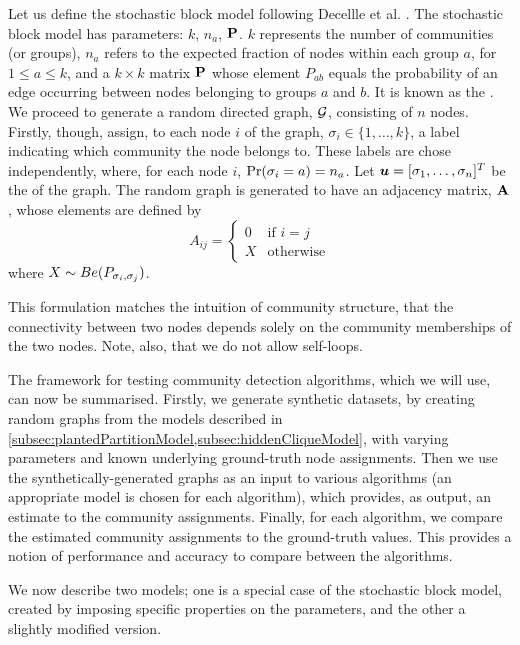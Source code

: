 Let us define the stochastic block model following Decellle et al. \cite{DKM+13}. The stochastic block model has parameters: $k$, $n_{a}$, $\mathbf P$. $k$ represents the number of communities (or groups), $n_{a}$ refers to the expected fraction of nodes within each group $a$, for $1 \leq a \leq k$, and a $k \times k$ matrix $\mathbf P$ whose element $P_{ab}$ equals the probability of an edge occurring between nodes belonging to groups $a$ and $b$. It is known as the .
We proceed to generate a random directed graph, $\mathcal G$, consisting of $n$ nodes.
Firstly, though, assign, to each node $i$ of the graph, $\sigma_{i} \in \{1,\dots,k\}$, a label indicating which community the node belongs to. These labels are chose independently, where, for each node $i$, $\Pr(\sigma_{i} = a) = n_{a}$.
Let $\vecvar{u} = \transpose{[\sigma_{1},\dots,\sigma_{n}]}$ be the  of the graph.
The random graph is generated to have an adjacency matrix, $\mathbf A$, whose elements are defined by
\begin{equation}
	\label{def:sbmAdjacencyMatrix}
	A_{ij} =
	\begin{cases}
		0 & \text{if } i = j\\
		X & \text{otherwise}
	\end{cases}
\end{equation}
where $X \sim Be(P_{\sigma_{i},\sigma_{j}})$.

This formulation matches the intuition of community structure, that the connectivity between two nodes depends solely on the community memberships of the two nodes.
Note, also, that we do not allow self-loops.

The framework for testing community detection algorithms, which we will use, can now be summarised.
Firstly, we generate synthetic datasets, by creating random graphs from the models described in \cref{subsec:plantedPartitionModel,subsec:hiddenCliqueModel}, with varying parameters and known underlying ground-truth node assignments.
Then we use the synthetically-generated graphs as an input to various algorithms (an appropriate model is chosen for each algorithm), which provides, as output, an estimate to the community assignments.
Finally, for each algorithm, we compare the estimated community assignments to the ground-truth values.
This provides a notion of performance and accuracy to compare between the algorithms.

We now describe two models; one is a special case of the stochastic block model, created by imposing specific properties on the parameters, and the other a slightly modified version.

